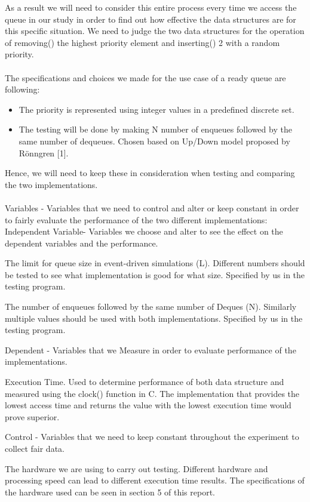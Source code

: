 \documentclass[12pt]{article}
\begin{document}
As a result we will need to consider this entire process every time we access the queue in our study in order to find out how effective the data structures are for this specific situation. We need to judge the two data structures for the operation of removing() the highest priority element and inserting() 2 with a random priority. 
\\
\\
The specifications and choices we made for the use case of a ready queue are following: 

\begin{itemize}
   \item The priority is represented using integer values in a predefined discrete set. 
   \item The testing will be done by making N number of enqueues followed by the same number of dequeues. Chosen based on Up/Down model proposed by Rönngren [1]. 
\end{itemize}

Hence, we will need to keep these in consideration when testing and comparing the two implementations.
\\
\\
Variables - Variables that we need to control and alter or keep constant in order to fairly evaluate the performance of the two different implementations:
Independent Variable- Variables we choose and alter to see the effect on the dependent variables and the performance. 


The limit for queue size in event-driven simulations (L). Different numbers should be tested to see what implementation is good for what size. Specified by us in the testing program.


The number of enqueues followed by the same number of Deques (N). Similarly multiple values should be used with both implementations. Specified by us in the testing program.


Dependent - Variables that we Measure in order to evaluate performance of the implementations. 


Execution Time. Used to determine performance of both data structure and measured using the clock() function in C. The implementation that provides the lowest access time and returns the value with the lowest execution time would prove superior.


Control - Variables that we need to keep constant throughout the experiment to collect fair data.


The hardware we are using to carry out testing. Different hardware and processing speed can lead to different execution time results. The specifications of the hardware used can be seen in section 5 of this report. 
\end{document}
